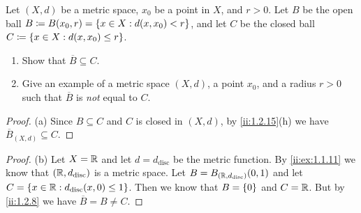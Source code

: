 \begin{ex}\label{ii:ex:1.2.4}
  Let \((X, d)\) be a metric space, \(x_0\) be a point in \(X\), and \(r > 0\).
  Let \(B\) be the open ball \(B \coloneqq B(x_0, r) = \left\lbrace x \in X : d(x, x_0) < r\right\rbrace\), and let \(C\) be the closed ball \(C \coloneqq \left\lbrace x \in X : d(x, x_0) \leq r\right\rbrace\).
  \begin{enumerate}
    \item Show that \(\overline{B} \subseteq C\).
    \item Give an example of a metric space \((X, d)\), a point \(x_0\), and a radius \(r > 0\) such that \(\overline{B}\) is \emph{not} equal to \(C\).
  \end{enumerate}
\end{ex}

\begin{proof}{(a)}
  Since \(B \subseteq C\) and \(C\) is closed in \((X, d)\), by \cref{ii:1.2.15}(h) we have \(\overline{B}_{(X, d)} \subseteq C\).
\end{proof}

\begin{proof}{(b)}
  Let \(X = \mathbb{R}\) and let \(d = d_{\text{disc}}\) be the metric function.
  By \cref{ii:ex:1.1.11} we know that \((\mathbb{R}, d_{\text{disc}})\) is a metric space.
  Let \(B = B_{(\mathbb{R}, d_{\text{disc}})}(0, 1)\) and let \(C = \left\lbrace x \in \mathbb{R} : d_{\text{disc}}(x, 0) \leq 1\right\rbrace\).
  Then we know that \(B = \left\lbrace0\right\rbrace\) and \(C = \mathbb{R}\).
  But by \cref{ii:1.2.8} we have \(\overline{B} = B \neq C\).
\end{proof}
